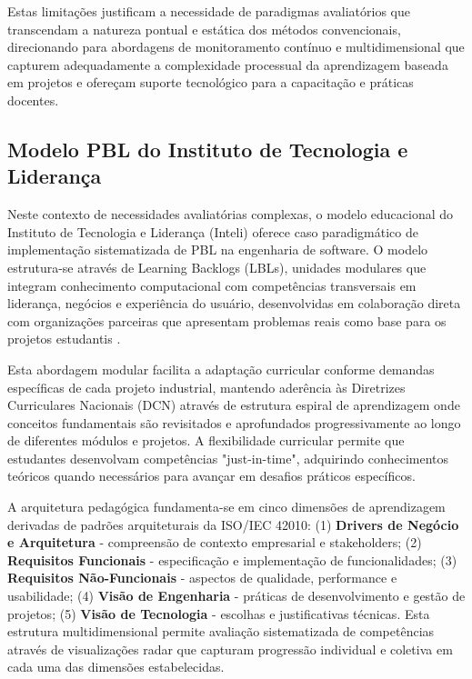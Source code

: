 \documentclass[english, spanish, brazilian]{RBIEarticle} %
\begin{document}
Estas limitações justificam a necessidade de paradigmas avaliatórios que
transcendam a natureza pontual e estática dos métodos convencionais,
direcionando para abordagens de monitoramento contínuo e multidimensional que
capturem adequadamente a complexidade processual da aprendizagem baseada em
projetos e ofereçam suporte tecnológico para a capacitação e práticas docentes.

\subsection{Modelo PBL do Instituto de Tecnologia e Liderança}

\indent

Neste contexto de necessidades avaliatórias complexas, o modelo educacional do
Instituto de Tecnologia e Liderança (Inteli) oferece caso paradigmático de
implementação sistematizada de PBL na engenharia de software. O modelo
estrutura-se através de Learning Backlogs (LBLs), unidades modulares que
integram conhecimento computacional com competências transversais em liderança,
negócios e experiência do usuário, desenvolvidas em colaboração direta com
organizações parceiras que apresentam problemas reais como base para os
projetos estudantis \cite{Valente2025}.

Esta abordagem modular facilita a adaptação curricular conforme demandas
específicas de cada projeto industrial, mantendo aderência às Diretrizes
Curriculares Nacionais (DCN) através de estrutura espiral de aprendizagem onde
conceitos fundamentais são revisitados e aprofundados progressivamente ao longo
de diferentes módulos e projetos. A flexibilidade curricular permite que
estudantes desenvolvam competências "just-in-time", adquirindo conhecimentos
teóricos quando necessários para avançar em desafios práticos específicos.

A arquitetura pedagógica fundamenta-se em cinco dimensões de aprendizagem
derivadas de padrões arquiteturais da ISO/IEC 42010: (1) \textbf{Drivers de
  Negócio e Arquitetura} - compreensão de contexto empresarial e stakeholders;
(2) \textbf{Requisitos Funcionais} - especificação e implementação de
funcionalidades; (3) \textbf{Requisitos Não-Funcionais} - aspectos de
qualidade, performance e usabilidade; (4) \textbf{Visão de Engenharia} -
práticas de desenvolvimento e gestão de projetos; (5) \textbf{Visão de
  Tecnologia} - escolhas e justificativas técnicas. Esta estrutura
multidimensional permite avaliação sistematizada de competências através de
visualizações radar que capturam progressão individual e coletiva em cada uma
das dimensões estabelecidas.
\end{document}
